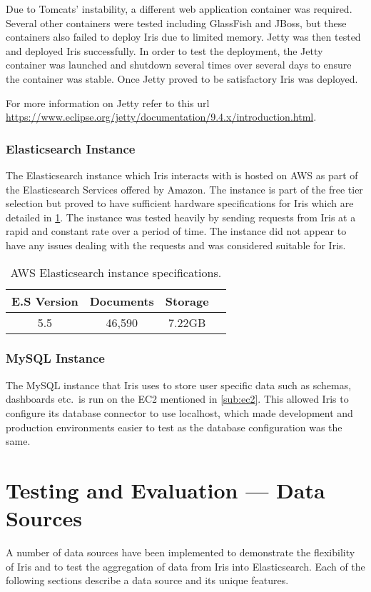 \documentclass[12pt,a4paper,titlepage]{report}
\begin{document}
Due to Tomcats' instability, a different web application container was required. Several other containers were tested including GlassFish and JBoss, but these containers also failed to deploy Iris due to limited memory. Jetty was then tested and deployed Iris successfully. In order to test the deployment, the Jetty container was launched and shutdown several times over several days to ensure the container was stable. Once Jetty proved to be satisfactory Iris was deployed.

For more information on Jetty refer to this url \url{https://www.eclipse.org/jetty/documentation/9.4.x/introduction.html}.
\subsubsection{Elasticsearch Instance}
The Elasticsearch instance which Iris interacts with is hosted on AWS as part of the Elasticsearch Services offered by Amazon. The instance is part of the free tier selection but proved to have sufficient hardware specifications for Iris which are detailed in \cref{table:elastic:specs}. The instance was tested heavily by sending requests from Iris at a rapid and constant rate over a period of time. The instance did not appear to have any issues dealing with the requests and was considered suitable for Iris.
\begin{table}[H]
\centering
\small
\setlength\tabcolsep{6pt}
 \begin{tabular}{|c|c|c|c|}
 \hline
 E.S Version & Documents & Storage\\
 \hline\hline
 5.5 & 46,590 & 7.22GB\\ 
 \hline
\end{tabular}
\caption{AWS Elasticsearch instance specifications.}
\label{table:elastic:specs}
\end{table}
\subsubsection{MySQL Instance}
\label{sub:mysql:instance}
The MySQL instance that Iris uses to store user specific data such as schemas, dashboards etc.\ is run on the EC2 mentioned in \cref{sub:ec2}. This allowed Iris to configure its database connector to use localhost, which made development and production environments easier to test as the database configuration was the same.
\section{Testing and Evaluation --- Data Sources}
\label{s:implementation:datasource}
A number of data sources have been implemented to demonstrate the flexibility of Iris and to test the aggregation of data from Iris into Elasticsearch. Each of the following sections describe a data source and its unique features.
\end{document}
